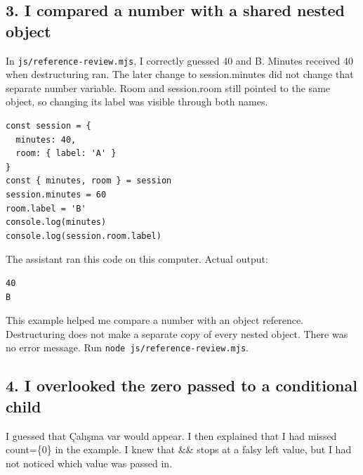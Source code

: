 \documentclass[
  10pt,
  a4paper,
]{article}
\begin{document}
\subsection{3. I compared a number with a shared nested
object}\label{i-compared-a-number-with-a-shared-nested-object}

In \texttt{js/\allowbreak{}reference-review.\allowbreak{}mjs}, I
correctly guessed 40 and B. Minutes received 40 when destructuring ran.
The later change to session.minutes did not change that separate number
variable. Room and session.room still pointed to the same object, so
changing its label was visible through both names.

\begin{minipage}{\linewidth}

\begin{lstlisting}
const session = {
  minutes: 40,
  room: { label: 'A' }
}
const { minutes, room } = session
session.minutes = 60
room.label = 'B'
console.log(minutes)
console.log(session.room.label)
\end{lstlisting}

\end{minipage}\par


The assistant ran this code on this computer. Actual output:

\begin{minipage}{\linewidth}

\begin{lstlisting}
40
B
\end{lstlisting}

\end{minipage}\par

This example helped me compare a number with an object reference.
Destructuring does not make a separate copy of every nested object.
There was no error message. Run
\texttt{node js/\allowbreak{}reference-review.\allowbreak{}mjs}.

\subsection{4. I overlooked the zero passed to a conditional
child}\label{i-overlooked-the-zero-passed-to-a-conditional-child}

I guessed that Çalışma var would appear. I then explained that I had
missed count=\{0\} in the example. I knew that \&\& stops at a falsy
left value, but I had not noticed which value was passed in.
\end{document}
